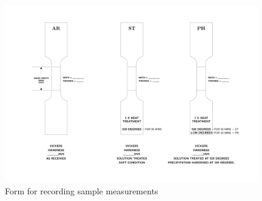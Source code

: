 \documentclass{article}
\begin{document}
\begin{figure}[H] 
    \centering 
    \includegraphics[width=0.98\textwidth,cfbox=gray!22 1pt]{figures/alloys_base.jpg} %
    \caption{Form for recording sample measurements} 
    \label{fig:alloys} 
\end{figure}
\end{document}
